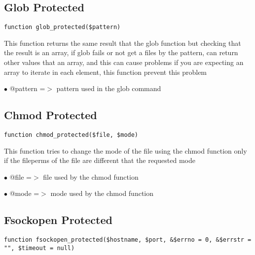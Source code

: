 \documentclass[a4paper]{book}
\begin{document}
\hypertarget{toc136}{}
\subsection{Glob Protected}

\begin{lstlisting}
function glob_protected($pattern)
\end{lstlisting}

This function returns the same result that the glob function but checking
that the result is an array, if glob fails or not get a files by the pattern,
can return other values that an array, and this can cause problems if you are
expecting an array to iterate in each element, this function prevent this
problem

\begin{compactitem}
\item[\color{myblue}$\bullet$] @pattern =$>$ pattern used in the glob command
\end{compactitem}

\hypertarget{toc137}{}
\subsection{Chmod Protected}

\begin{lstlisting}
function chmod_protected($file, $mode)
\end{lstlisting}

This function tries to change the mode of the file using the chmod function
only if the fileperms of the file are different that the requested mode

\begin{compactitem}
\item[\color{myblue}$\bullet$] @file =$>$ file used by the chmod function
\item[\color{myblue}$\bullet$] @mode =$>$ mode used by the chmod function
\end{compactitem}

\hypertarget{toc138}{}
\subsection{Fsockopen Protected}

\begin{lstlisting}
function fsockopen_protected($hostname, $port, &$errno = 0, &$errstr = "", $timeout = null)
\end{lstlisting}
\end{document}
